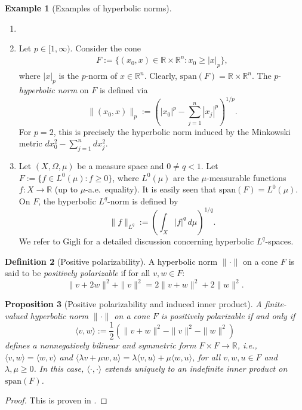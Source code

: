 \documentclass[a4paper,11pt]{article}
\numberwithin{equation}{section}
\theoremstyle{definition}
\newtheorem{Definition}{Definition}[section]
\newtheorem{Example}[Definition]{Example}
\theoremstyle{plain}
\newtheorem{Proposition}[Definition]{Proposition}
\newcommand{\R}{\mathbb R}
\newcommand{\spn}{\mathrm{span}}
\begin{document}
\begin{Example}[Examples of hyperbolic norms]
\begin{enumerate}
    \item[]
    \item Let $p \in [1,\infty)$. Consider the cone
    \begin{align*}
        F:=\{(x_0,x) \in \R \times \R^n : x_0 \geq |x|_p\},
    \end{align*}
    where $|x|_p$ is the $p$-norm of $x \in \R^n$. Clearly, $\spn(F) = \R \times \R^n$. The $p$-\emph{hyperbolic norm} on $F$ is defined via
    \begin{equation}
    \|(x_0,x)\|_p:=\left( |x_0|^p - \sum_{j=1}^n |x_j|^p \right)^{1/p}.
    \end{equation}
    For $p=2$, this is precisely the hyperbolic norm induced by the Minkowski metric $dx_0^2 - \sum_{j=1}^n dx_j^2$.
    \item Let $(X,\Omega,\mu)$ be a measure space and $0 \neq q < 1$. Let $F:=\{f \in L^0(\mu): f \geq 0\}$, where $L^0(\mu)$ are the $\mu$-measurable functions $f:X \to \R$ (up to $\mu$-a.e.\ equality). It is easily seen that $\spn(F) = L^0(\mu)$. On $F$, the hyperbolic $L^q$-norm is defined by
    \begin{equation}
        \|f\|_{L^q}:=\left(\int_X |f|^q \, d\mu\right)^{1/q}.
    \end{equation}
    We refer to Gigli \cite{gigli2025hyperbolic2} for a detailed discussion concerning hyperbolic $L^q$-spaces.
\end{enumerate}
\end{Example}

\begin{Definition}[Positive polarizability]\label{Definition: positivepolarizability}
A hyperbolic norm $\|\cdot\|$ on a cone $F$ is said to be \emph{positively polarizable} if for all $v,w \in F$:
\begin{equation}
    \|v + 2w\|^2 + \|v\|^2 = 2 \|v + w\|^2 + 2\|w\|^2.
\end{equation}
\end{Definition}

\begin{Proposition}[Positive polarizability and induced inner product]
    A finite-valued hyperbolic norm $\|\cdot\|$ on a cone $F$ is positively polarizable if and only if 
    \begin{equation}
        \langle v,w \rangle := \frac{1}{2}(\|v + w\|^2 - \|v\|^2 - \|w\|^2)
    \end{equation}
    defines a nonnegatively bilinear and symmetric form $F \times F \to \R$, i.e., $\langle v,w \rangle = \langle w,v \rangle$ and $\langle \lambda v + \mu w,u\rangle = \lambda \langle v,u\rangle + \mu\langle w,u\rangle$, for all $v,w,u \in F$ and $\lambda,\mu \geq 0$. In this case, $\langle \cdot,\cdot\rangle$ extends uniquely to an indefinite inner product on $\spn(F)$.
\end{Proposition}
\begin{proof}
    This is proven in \cite[Lem.\ A.12]{beran2024nonlinear}.
\end{proof}
\end{document}
